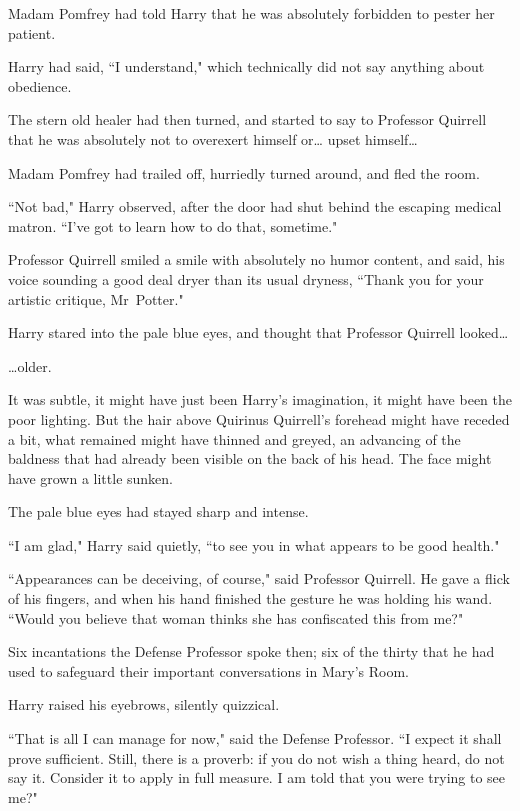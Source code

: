Madam Pomfrey had told Harry that he was absolutely forbidden to pester her patient.

Harry had said, ``I understand," which technically did not say anything about obedience.

The stern old healer had then turned, and started to say to Professor Quirrell that he was absolutely not to overexert himself or{\ldots} upset himself{\ldots}

Madam Pomfrey had trailed off, hurriedly turned around, and fled the room.

``Not bad," Harry observed, after the door had shut behind the escaping medical matron. ``I've got to learn how to do that, sometime."

Professor Quirrell smiled a smile with absolutely no humor content, and said, his voice sounding a good deal dryer than its usual dryness, ``Thank you for your artistic critique, Mr~Potter."

Harry stared into the pale blue eyes, and thought that Professor Quirrell looked{\ldots}

{\ldots}older.

It was subtle, it might have just been Harry's imagination, it might have been the poor lighting. But the hair above Quirinus Quirrell's forehead might have receded a bit, what remained might have thinned and greyed, an advancing of the baldness that had already been visible on the back of his head. The face might have grown a little sunken.

The pale blue eyes had stayed sharp and intense.

``I am glad," Harry said quietly, ``to see you in what appears to be good health."

``Appearances can be deceiving, of course," said Professor Quirrell. He gave a flick of his fingers, and when his hand finished the gesture he was holding his wand. ``Would you believe that woman thinks she has confiscated this from me?"

Six incantations the Defense Professor spoke then; six of the thirty that he had used to safeguard their important conversations in Mary's Room.

Harry raised his eyebrows, silently quizzical.

``That is all I can manage for now," said the Defense Professor. ``I expect it shall prove sufficient. Still, there is a proverb: if you do not wish a thing heard, do not say it. Consider it to apply in full measure. I am told that you were trying to see me?"

